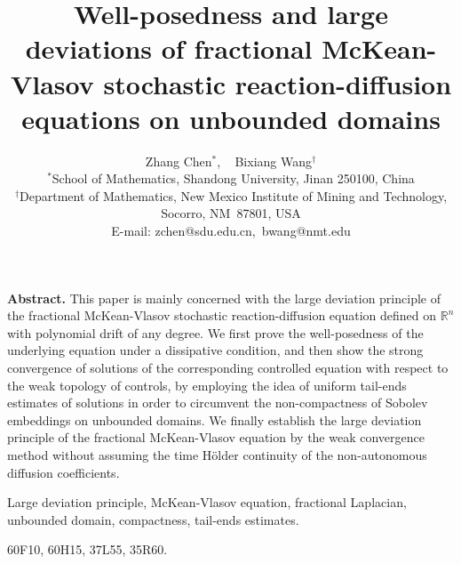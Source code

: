 \documentclass[11pt]{article}
\numberwithin{equation}{section}
\theoremstyle{plain}
\begin{document}
\title{
       {\Large
          \bf{Well-posedness and large deviations of fractional McKean-Vlasov stochastic reaction-diffusion equations on unbounded domains
              }
       }
      }

\author{Zhang Chen$^{\ast}$, \  %
        Bixiang Wang$^{\dagger}$ %
\\
\normalsize{$^\ast$School of Mathematics, Shandong University, Jinan 250100,  China} \\
\normalsize{$^\dagger$Department of Mathematics, New Mexico Institute of Mining and Technology,} \\
\normalsize{Socorro,  NM~87801, USA}\\
\normalsize{E-mail: zchen@sdu.edu.cn,\  bwang@nmt.edu} }


\date{}
 \maketitle
\begin{minipage}{14cm}
{\bf Abstract.}  This paper is mainly concerned with the large
deviation principle of the fractional McKean-Vlasov stochastic
reaction-diffusion equation defined on $\mathbb{R}^n$ with
polynomial drift of any degree. We first prove the well-posedness of
the underlying equation under a dissipative condition, and then show
the strong convergence of solutions of the corresponding controlled
equation with respect to the weak topology of controls, by employing
the idea of uniform tail-ends estimates of solutions in order to
circumvent the non-compactness of Sobolev embeddings on unbounded
domains. We finally establish the large deviation principle of the
fractional McKean-Vlasov equation by the weak convergence method
without assuming the time H\"{o}lder continuity of the
non-autonomous diffusion coefficients.



\vspace{2mm}

 Large deviation principle,  McKean-Vlasov  equation,
  fractional   Laplacian,   unbounded domain, compactness,
   tail-ends estimates.


 \vspace{2mm}

  60F10, 60H15, 37L55, 35R60.

\end{minipage}
\end{document}
